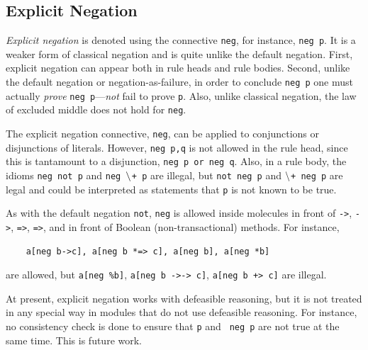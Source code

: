 \documentclass[11pt]{article}
\newcommand{\NAF}{\mbox{\tt \ensuremath{\tt\backslash}+}\xspace}
\newcommand{\TNOT}{{{\tt not}}\xspace}
\begin{document}
\subsection{Explicit Negation}
\label{sec-explicit-negation}

\emph{Explicit negation} is denoted using the connective {\tt neg}, for
instance, {\tt neg p}. It is a weaker form of classical negation and is
quite unlike the default negation. First, explicit negation can appear both
in rule heads and rule bodies. Second, unlike the default negation or
negation-as-failure, in order to conclude {\tt neg p} one must actually
\emph{prove} {\tt neg p}---\emph{not} fail to prove {\tt p}. Also, unlike
classical negation, the law of excluded middle does not hold for {\tt neg}.

The explicit negation connective, {\tt neg}, can be applied to conjunctions
or disjunctions of literals. However, {\tt neg p,q} is not allowed in the
rule head, since this is tantamount to a disjunction, {\tt neg p or neg q}.  
Also, in a rule body, the idioms {\tt neg not p} and {\tt neg \NAF p} are
illegal, but {\tt not neg p} and {\tt \NAF neg p} are legal and could be
interpreted as statements that {\tt p} is not known to be true. 

As with the default negation \TNOT, {\tt neg} is allowed inside molecules 
in front of {\tt ->}, {\tt *->}, {\tt =>}, {\tt *=>}, and in front of
Boolean (non-transactional) methods. For instance,
\begin{verbatim}
    a[neg b->c], a[neg b *=> c], a[neg b], a[neg *b]
\end{verbatim}
are allowed, but {\tt a[neg \%b]}, {\tt a[neg b ->-> c]}, {\tt a[neg b
  +> c]} are illegal.  

At present, explicit negation works with defeasible reasoning, but it is
not treated in any special way in modules that do not use defeasible reasoning.
For instance, no consistency check is done to ensure that {\tt p} and {\tt
  neg p} are not true at the same time. This is future work.
\end{document}
